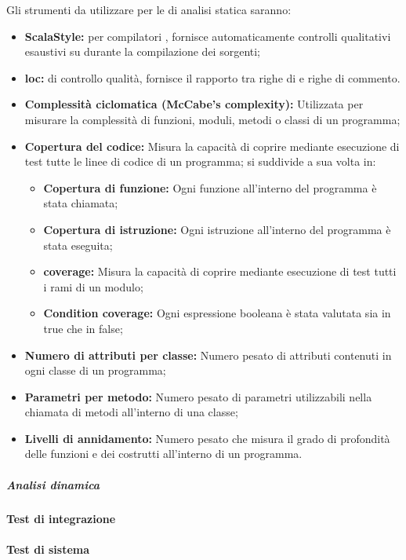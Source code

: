 \documentclass{scalatekids-article}
\begin{document}
Gli strumenti da utilizzare per le  di analisi statica saranno:
\begin{itemize}
\item\textbf{ScalaStyle:}  per compilatori , fornisce automaticamente controlli qualitativi esaustivi su  durante la compilazione dei sorgenti;
\item\textbf{loc:}  di controllo qualità, fornisce il rapporto tra righe di  e righe di commento.
\item\textbf{Complessità ciclomatica (McCabe's complexity):} Utilizzata per
  misurare la complessità di funzioni, moduli, metodi o classi di un
  programma;
\item\textbf{Copertura del codice:} Misura la capacità di coprire mediante
  esecuzione di test tutte le linee di codice di un programma; si
  suddivide a sua volta in:
  \begin{itemize}
  \item\textbf{Copertura di funzione:} Ogni funzione all'interno del
    programma è stata chiamata;
  \item\textbf{Copertura di istruzione:} Ogni istruzione all'interno
    del programma è stata eseguita;
  \item\textbf{ coverage:} Misura la capacità di coprire
    mediante esecuzione di test tutti i rami di un modulo;
  \item\textbf{Condition coverage:} Ogni espressione booleana è stata
    valutata sia in true che in false;
  \end{itemize}
\item\textbf{Numero di attributi per classe:} Numero pesato di attributi
  contenuti in ogni classe di un programma;
\item\textbf{Parametri per metodo:} Numero pesato di parametri utilizzabili
  nella chiamata di metodi all'interno di una classe;
\item\textbf{Livelli di annidamento:} Numero pesato che misura il grado di
  profondità delle funzioni e dei costrutti all'interno di un programma.
\end{itemize}

\subparagraph{Analisi dinamica}

\paragraph{Test di integrazione}

\paragraph{Test di sistema}
\end{document}
